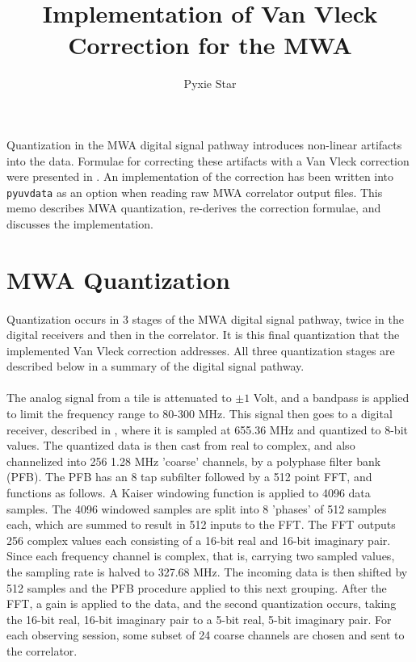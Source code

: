 \documentclass[11pt]{article}
\title{Implementation of Van Vleck Correction for the MWA}
\author{Pyxie Star}
\begin{document}
\maketitle
\paragraph{}Quantization in the MWA digital signal pathway introduces non-linear artifacts into the data. Formulae for correcting these artifacts with a Van Vleck correction were presented in \cite{VV}. An implementation of the correction has been written into \texttt{pyuvdata} as an option when reading raw MWA correlator output files. This memo describes MWA quantization, re-derives the correction formulae, and discusses the implementation.
\section{MWA Quantization}
\paragraph{}
Quantization occurs in 3 stages of the MWA digital signal pathway, twice in the digital receivers and then in the correlator. It is this final quantization that the implemented Van Vleck correction addresses. All three quantization stages are described below in a summary of the digital signal pathway.
\paragraph{}
The analog signal from a tile is attenuated to $\pm1$ Volt, and a bandpass is applied to limit the frequency range to 80-300 MHz. This signal then goes to a digital receiver, described in \cite{rec}, where it is sampled at 655.36 MHz and quantized to 8-bit values. The quantized data is then cast from real to complex, and also channelized into 256 1.28 MHz 'coarse' channels, by a polyphase filter bank (PFB). The PFB has an 8 tap subfilter followed by a 512 point FFT, and functions as follows. A Kaiser windowing function is applied to 4096 data samples. The 4096 windowed samples are split into 8 'phases' of 512 samples each, which are summed to result in 512 inputs to the FFT. The FFT outputs 256 complex values each consisting of a 16-bit real and 16-bit imaginary pair. Since each frequency channel is complex, that is, carrying two sampled values, the sampling rate is halved to 327.68 MHz. The incoming data is then shifted by 512 samples and the PFB procedure applied to this next grouping. After the FFT, a gain is applied to the data, and the second quantization occurs, taking the 16-bit real, 16-bit imaginary pair to a 5-bit real, 5-bit imaginary pair. For each observing session, some subset of 24 coarse channels are chosen and sent to the correlator. 
\end{document}
